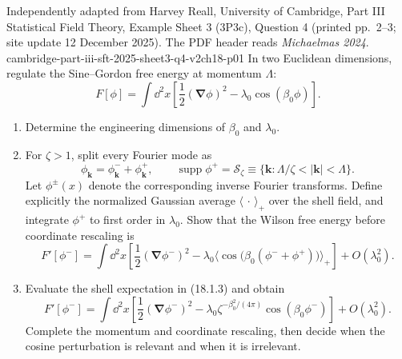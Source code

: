 
\begin{enumerate}
  {Independently adapted from Harvey Reall, University of Cambridge,
  Part III Statistical Field Theory, Example Sheet 3 (3P3c), Question 4
  (printed pp.~2--3; site update 12 December 2025).  The PDF header reads
  \emph{Michaelmas 2024}.}
  {cambridge-part-iii-sft-2025-sheet3-q4-v2ch18-p01}
  In two Euclidean dimensions, regulate the Sine--Gordon free energy at
  momentum \(\Lambda\):
  \[
    F[\phi]=\int \dd^2x\left[
      \frac12(\boldsymbol\nabla\phi)^2
      -\lambda_0\cos(\beta_0\phi)
    \right].
    \tag{18.1.1}
  \]
  \begin{enumerate}
    \item[(a)]
    Determine the engineering dimensions of \(\beta_0\) and \(\lambda_0\).

    \item[(b)]
    For \(\zeta>1\), split every Fourier mode as
    \[
      \phi_{\mathbf k}=\phi_{\mathbf k}^-+\phi_{\mathbf k}^+,
      \qquad
      \operatorname{supp}\phi^+
      =\mathcal S_\zeta
      \equiv\{\mathbf k:\Lambda/\zeta<|\mathbf k|<\Lambda\}.
      \tag{18.1.2}
    \]
    Let \(\phi^\pm(x)\) denote the corresponding inverse Fourier
    transforms.  Define explicitly the normalized Gaussian average
    \(\langle\,\cdot\,\rangle_+\) over the shell field, and integrate
    \(\phi^+\) to first order in \(\lambda_0\).  Show that the Wilson free
    energy before coordinate rescaling is
    \[
      F'[\phi^-]=\int \dd^2x\left[
        \frac12(\boldsymbol\nabla\phi^-)^2
        -\lambda_0
          \bigl\langle
            \cos\!\bigl(\beta_0(\phi^-+\phi^+)\bigr)
          \bigr\rangle_+
      \right]+O(\lambda_0^2).
      \tag{18.1.3}
    \]

    \item[(c)]
    Evaluate the shell expectation in (18.1.3) and obtain
    \[
      F'[\phi^-]=\int \dd^2x\left[
        \frac12(\boldsymbol\nabla\phi^-)^2
        -\lambda_0\zeta^{-\beta_0^2/(4\pi)}
          \cos(\beta_0\phi^-)
      \right]+O(\lambda_0^2).
      \tag{18.1.4}
    \]
    Complete the momentum and coordinate rescaling, then decide when the
    cosine perturbation is relevant and when it is irrelevant.


\end{enumerate}
\end{enumerate}
